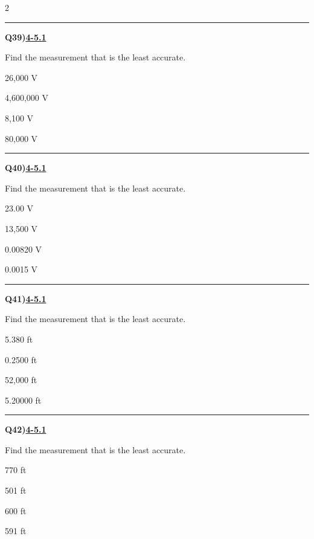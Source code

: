 \documentclass[11pt]{article}
\newenvironment{Qbox}[2]{%
  \par\medskip\noindent\begin{minipage}{\linewidth}%
  \hrule\medskip%
  \textbf{Q#1)}\hfill\textbf{\underline{#2}}\par\smallskip%
}{\par\end{minipage}\par\medskip}
\begin{document}
\begin{multicols}{2}
\begin{Qbox}{39}{4-5.1}
Find the measurement that is the least accurate.
\begin{choices}
  \item 26,000 V
  \item 4,600,000 V
  \item 8,100 V
  \item 80,000 V
\end{choices}
\end{Qbox}

\begin{Qbox}{40}{4-5.1}
Find the measurement that is the least accurate.
\begin{choices}
  \item 23.00 V
  \item 13,500 V
  \item 0.00820 V
  \item 0.0015 V
\end{choices}
\end{Qbox}

\begin{Qbox}{41}{4-5.1}
Find the measurement that is the least accurate.
\begin{choices}
  \item 5.380 ft
  \item 0.2500 ft
  \item 52,000 ft
  \item 5.20000 ft
\end{choices}
\end{Qbox}

\begin{Qbox}{42}{4-5.1}
Find the measurement that is the least accurate.
\begin{choices}
  \item 770 ft
  \item 501 ft
  \item 600 ft
  \item 591 ft
\end{choices}
\end{Qbox}


\end{multicols}
\end{document}
